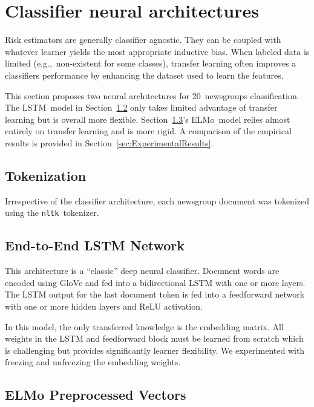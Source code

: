 \section{Classifier neural architectures}\label{sec:Architectures}

Risk estimators are generally classifier agnostic.  They can be coupled with whatever learner yields the most appropriate inductive bias. When labeled data is limited (e.g.,~non-existent for some classes), transfer learning often improves a classifiers performance by enhancing the dataset used to learn the features.

This section proposes two neural architectures for 20~newsgroups classification.  The LSTM~model in Section~\ref{sec:Architectures:LSTM} only takes limited advantage of transfer learning but is overall more flexible.  Section~\ref{sec:Architectures:ELMo}'s ELMo~model relies almost entirely on transfer learning and is more rigid. A comparison of the empirical results is provided in Section~\ref{sec:ExperimentalResults}.

\subsection{Tokenization}

Irrespective of the classifier architecture, each newsgroup document was tokenized using the \texttt{nltk}~tokenizer.

\subsection{End-to-End LSTM Network}\label{sec:Architectures:LSTM}

This architecture is a ``classic'' deep neural classifier.  Document words are encoded using GloVe and fed into a bidirectional LSTM with one or more layers.  The LSTM output for the last document token is fed into a feedforward network with one or more hidden layers and ReLU activation.

In this model, the only transferred knowledge is the embedding matrix. All weights in the LSTM and feedforward block must be learned from scratch which is challenging but provides significantly learner flexibility.  We experimented with freezing and unfreezing the embedding weights.

\subsection{ELMo Preprocessed Vectors}\label{sec:Architectures:ELMo}

